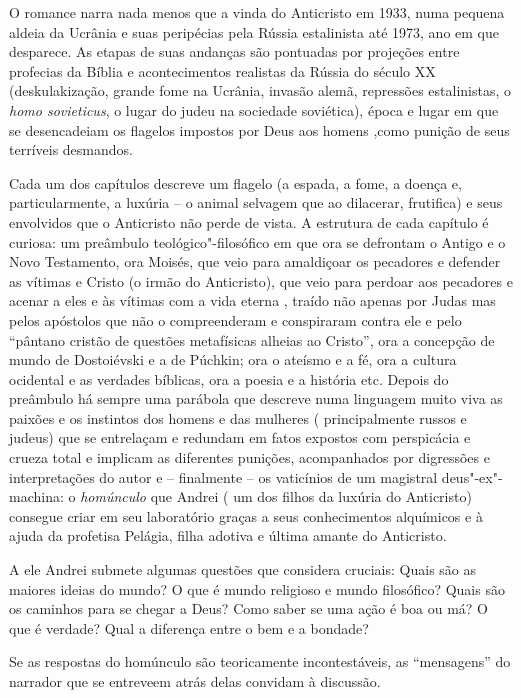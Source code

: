O romance narra nada menos que a vinda do Anticristo em 1933, numa
pequena aldeia da Ucrânia e suas peripécias pela Rússia estalinista até
1973, ano em que desparece. As etapas de suas andanças são pontuadas por
projeções entre profecias da Bíblia e acontecimentos realistas da Rússia
do século XX (deskulakização, grande fome na Ucrânia, invasão alemã,
repressões estalinistas, o \emph{homo sovieticus}, o lugar do judeu na
sociedade soviética), época e lugar em que se desencadeiam os flagelos
impostos por Deus aos homens ,como punição de seus terríveis desmandos.

Cada um dos capítulos descreve um flagelo (a espada, a fome, a doença e,
particularmente, a luxúria -- o animal selvagem que ao dilacerar,
frutifica) e seus envolvidos que o Anticristo não perde de vista. A
estrutura de cada capítulo é curiosa: um preâmbulo teológico"-filosófico
em que ora se defrontam o Antigo e o Novo Testamento, ora Moisés, que
veio para amaldiçoar os pecadores e defender as vítimas e Cristo (o
irmão do Anticristo), que veio para perdoar aos pecadores e acenar a
eles e às vítimas com a vida eterna , traído não apenas por Judas mas
pelos apóstolos que não o compreenderam e conspiraram contra ele e pelo
``pântano cristão de questões metafísicas alheias ao Cristo'', ora a
concepção de mundo de Dostoiévski e a de Púchkin; ora o ateísmo e a fé,
ora a cultura ocidental e as verdades bíblicas, ora a poesia e a
história etc. Depois do preâmbulo há sempre uma parábola que descreve
numa linguagem muito viva as paixões e os instintos dos homens e das
mulheres ( principalmente russos e judeus) que se entrelaçam e redundam
em fatos expostos com perspicácia e crueza total e implicam as
diferentes punições, acompanhados por digressões e interpretações do
autor e -- finalmente -- os vaticínios de um magistral deus"-ex"-machina:
o \emph{homúnculo} que Andrei ( um dos filhos da luxúria do Anticristo)
consegue criar em seu laboratório graças a seus conhecimentos alquímicos
e à ajuda da profetisa Pelágia, filha adotiva e última amante do
Anticristo.

A ele Andrei submete algumas questões que considera cruciais: Quais são
as maiores ideias do mundo? O que é mundo religioso e mundo filosófico?
Quais são os caminhos para se chegar a Deus? Como saber se uma ação é
boa ou má? O que é verdade? Qual a diferença entre o bem e a bondade?

Se as respostas do homúnculo são teoricamente incontestáveis, as
``mensagens'' do narrador que se entreveem atrás delas convidam à
discussão.

